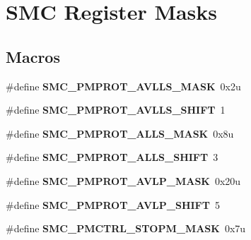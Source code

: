 \hypertarget{group__SMC__Register__Masks}{}\section{S\+MC Register Masks}
\label{group__SMC__Register__Masks}
\subsection*{Macros}
\begin{DoxyCompactItemize}
\item 
\#define {\bfseries S\+M\+C\+\_\+\+P\+M\+P\+R\+O\+T\+\_\+\+A\+V\+L\+L\+S\+\_\+\+M\+A\+SK}~0x2u\hypertarget{group__SMC__Register__Masks_ga62e9f3c7e74a3e5b80b0fae8a896640d}{}\label{group__SMC__Register__Masks_ga62e9f3c7e74a3e5b80b0fae8a896640d}

\item 
\#define {\bfseries S\+M\+C\+\_\+\+P\+M\+P\+R\+O\+T\+\_\+\+A\+V\+L\+L\+S\+\_\+\+S\+H\+I\+FT}~1\hypertarget{group__SMC__Register__Masks_gad625b387a627eb3a69f3a26edc0096b8}{}\label{group__SMC__Register__Masks_gad625b387a627eb3a69f3a26edc0096b8}

\item 
\#define {\bfseries S\+M\+C\+\_\+\+P\+M\+P\+R\+O\+T\+\_\+\+A\+L\+L\+S\+\_\+\+M\+A\+SK}~0x8u\hypertarget{group__SMC__Register__Masks_ga79d87e312be895d4f2bdfdda8c947600}{}\label{group__SMC__Register__Masks_ga79d87e312be895d4f2bdfdda8c947600}

\item 
\#define {\bfseries S\+M\+C\+\_\+\+P\+M\+P\+R\+O\+T\+\_\+\+A\+L\+L\+S\+\_\+\+S\+H\+I\+FT}~3\hypertarget{group__SMC__Register__Masks_gac6cb1305b9cb329a8bb903036893db11}{}\label{group__SMC__Register__Masks_gac6cb1305b9cb329a8bb903036893db11}

\item 
\#define {\bfseries S\+M\+C\+\_\+\+P\+M\+P\+R\+O\+T\+\_\+\+A\+V\+L\+P\+\_\+\+M\+A\+SK}~0x20u\hypertarget{group__SMC__Register__Masks_ga30602dafb393b5d9c52f0c75e1d78210}{}\label{group__SMC__Register__Masks_ga30602dafb393b5d9c52f0c75e1d78210}

\item 
\#define {\bfseries S\+M\+C\+\_\+\+P\+M\+P\+R\+O\+T\+\_\+\+A\+V\+L\+P\+\_\+\+S\+H\+I\+FT}~5\hypertarget{group__SMC__Register__Masks_gae13777e671c1caf2d10809999574fed4}{}\label{group__SMC__Register__Masks_gae13777e671c1caf2d10809999574fed4}

\item 
\#define {\bfseries S\+M\+C\+\_\+\+P\+M\+C\+T\+R\+L\+\_\+\+S\+T\+O\+P\+M\+\_\+\+M\+A\+SK}~0x7u\hypertarget{group__SMC__Register__Masks_ga8df79d8a16a6d12e3b343eec59d9453c}{}\label{group__SMC__Register__Masks_ga8df79d8a16a6d12e3b343eec59d9453c}


\end{DoxyCompactItemize}
